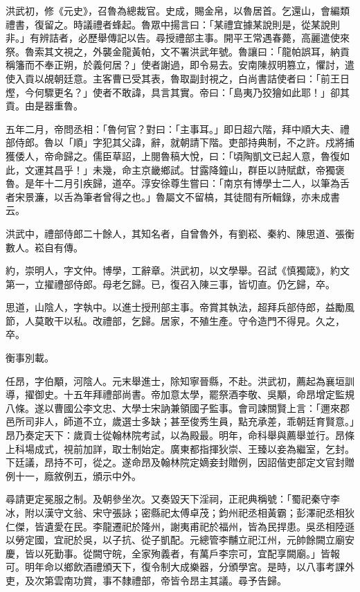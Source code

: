\begin{pinyinscope}
洪武初，修《元史》，召魯為總裁官。史成，賜金帛，以魯居首。乞還山，會編類禮書，復留之。時議禮者蜂起。魯眾中揚言曰：「某禮宜據某說則是，從某說則非。」有辨詰者，必歷舉傳記以告。尋授禮部主事。開平王常遇春薨，高麗遣使來祭。魯索其文視之，外襲金龍黃帕，文不署洪武年號。魯讓曰：「龍帕誤耳，納貢稱籓而不奉正朔，於義何居？」使者謝過，即令易去。安南陳叔明篡立，懼討，遣使入貢以覘朝廷意。主客曹已受其表，魯取副封視之，白尚書詰使者曰：「前王日熞，今何驟更名？」使者不敢諱，具言其實。帝曰：「島夷乃狡獪如此耶！」卻其貢。由是器重魯。

五年二月，帝問丞相：「魯何官？對曰：「主事耳。」即日超六階，拜中順大夫、禮部侍郎。魯以「順」字犯其父諱，辭，就朝請下階。吏部持典制，不之許。戍將捕獲倭人，帝命歸之。儒臣草詔，上閱魯稿大悅，曰：「頃陶凱文已起人意，魯復如此，文運其昌乎！」未幾，命主京畿鄉試。甘露降鐘山，群臣以詩賦獻，帝獨褒魯。是年十二月引疾歸，道卒。淳安徐尊生嘗曰：「南京有博學士二人，以筆為舌者宋景濂，以舌為筆者曾得之也。」魯屬文不留槁，其徒間有所輯錄，亦未成書云。

洪武中，禮部侍郎二十餘人，其知名者，自曾魯外，有劉崧、秦約、陳思道、張衡數人。崧自有傳。

約，崇明人，字文仲。博學，工辭章。洪武初，以文學舉。召試《慎獨箴》，約文第一，立擢禮部侍郎。母老乞歸。已，復召入陳三事，皆切直。仍乞歸，卒。

思道，山陰人，字執中。以進士授刑部主事。帝賞其執法，超拜兵部侍郎，益勵風節，人莫敢干以私。改禮部，乞歸。居家，不殖生產。守令造門不得見。久之，卒。

衡事別載。

任昂，字伯顒，河陰人。元末舉進士，除知寧晉縣，不赴。洪武初，薦起為襄垣訓導，擢御史。十五年拜禮部尚書。帝加意太學，罷祭酒李敬、吳顒，命昂增定監規八條。遂以曹國公李文忠、大學士宋訥兼領國子監事。會司諫關賢上言：「邇來郡邑所司非人，師道不立，歲選士多缺；甚至俊秀生員，點充承差，乖朝廷育賢意。」昂乃奏定天下：歲貢士從翰林院考試，以為殿最。明年，命科舉與薦舉並行。昂條上科場成式，視前加詳，取士制始定。廣東都指揮狄崇、王臻以妾為繼室，乞封。下廷議，昂持不可，從之。遂命昂及翰林院定嫡妾封贈例，因詔偕吏部定文官封贈例十一，廕敘例五，頒示中外。

尋請更定冕服之制。及朝參坐次。又奏毀天下淫祠，正祀典稱號：「蜀祀秦守李冰，附以漢守文翁、宋守張詠；密縣祀太傅卓茂；鈞州祀丞相黃霸；彭澤祀丞相狄仁傑，皆遺愛在民。李龍遷祀於隆州，謝夷甫祀於福州，皆為民捍患。吳丞相陸遜以勞定國，宜祀於吳，以子抗、從子凱配。元總管李黼立祀江州，元帥餘闕立廟安慶，皆以死勤事。從闕守皖，全家殉義者，有萬戶李宗可，宜配享闕廟。」皆報可。明年命以鄉飲酒禮頒天下，復令制大成樂器，分頒學宮。是時，以八事考課外吏，及次第雲南功賞，事不隸禮部，帝皆令昂主其議。尋予告歸。


\end{pinyinscope}
